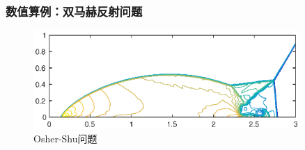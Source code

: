 \documentclass[8pt,mathserif]{beamer}
\begin{document}
\begin{frame}
  \frametitle{数值算例：双马赫反射问题}
\begin{figure}[H]
  \begin{center}
    \includegraphics[width=0.9\textwidth]{../doc/images/MachReflection-960-240-MC.eps}
  \end{center}
  \caption{Osher-Shu问题}
\end{figure}
\end{frame}
\end{document}
